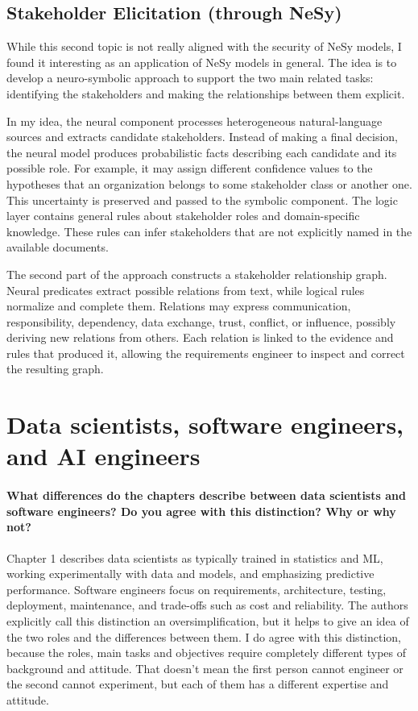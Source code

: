 \documentclass[11pt]{article}
\begin{document}
\subsection{Stakeholder Elicitation (through NeSy)}
While this second topic is not really aligned with the security of NeSy models, I found it interesting as an application of NeSy models in general. The idea is to develop a neuro-symbolic approach to support the two main related tasks: identifying the stakeholders and making the relationships between them explicit.

In my idea, the neural component processes heterogeneous natural-language sources and extracts candidate stakeholders. Instead of making a final decision, the neural model produces probabilistic facts describing each candidate and its possible role. For example, it may assign different confidence values to the hypotheses that an organization belongs to some stakeholder class or another one. This uncertainty is preserved and passed to the symbolic component.
The logic layer contains general rules about stakeholder roles and domain-specific knowledge. These rules can infer stakeholders that are not explicitly named in the available documents. 

The second part of the approach constructs a stakeholder relationship graph. Neural predicates extract possible relations from text, while logical rules normalize and complete them. Relations may express communication, responsibility, dependency, data exchange, trust, conflict, or influence, possibly deriving new relations from others.
Each relation is linked to the evidence and rules that produced it, allowing the requirements engineer to inspect and correct the resulting graph.

\section{Data scientists, software engineers, and AI engineers}

\paragraph{What differences do the chapters describe between data scientists and software engineers? Do you agree with this distinction? Why or why not?}
Chapter 1 describes data scientists as typically trained in statistics and ML, working experimentally with data and models, and emphasizing predictive performance. Software engineers focus on requirements, architecture, testing, deployment, maintenance, and trade-offs such as cost and reliability. The authors explicitly call this distinction an oversimplification, but it helps to give an idea of the two roles and the differences between them. I do agree with this distinction, because the roles, main tasks and objectives require completely different types of background and attitude. That doesn't mean the first person cannot engineer or the second cannot experiment, but each of them has a different expertise and attitude.
\end{document}
